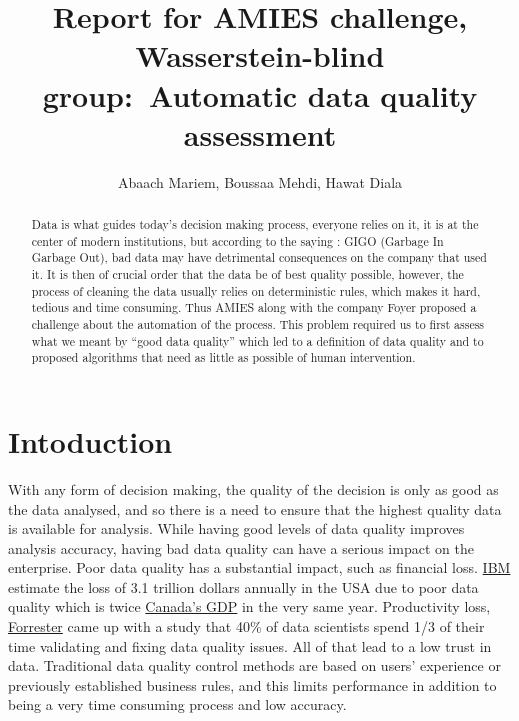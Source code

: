 \documentclass{article}
\title{\Large Report for AMIES challenge, Wasserstein-blind group:\ Automatic data quality assessment}
\author{Abaach Mariem, Boussaa Mehdi, Hawat Diala}
\date{}
\begin{document}
\maketitle

\begin{abstract}
    Data is what guides today's decision making process, everyone relies on it, it is at the center of modern institutions, but according to the saying : GIGO (Garbage In Garbage Out), bad data may have detrimental consequences on the company that used it.  It is then of crucial order that the data be of best quality possible, however, the process of cleaning the data usually relies on deterministic rules, which makes it hard, tedious and time consuming. Thus AMIES along with the company Foyer proposed a challenge about the automation of the process. This problem required us to first assess what we meant by ``good data quality'' which led to a definition of data quality and to proposed algorithms that need as little as possible of human intervention.
\end{abstract}
\tableofcontents
\section{Intoduction} %
\label{sec:Intoduction}
With any form of decision making, the quality of the decision is only as good as the data analysed, and so there is a need to ensure that the highest quality data is available for analysis. While having good levels of data quality improves analysis accuracy, having bad data quality can have a serious impact on the enterprise.
Poor data quality has a substantial impact, such as financial loss.  \href{https://www.ibm.com/blogs/journey-to-ai/}{IBM} estimate the loss of 3.1 trillion dollars annually  in the USA due to poor data quality which is twice \href{https://data.worldbank.org/indicator/NY.GDP.MKTP.CD}{Canada’s GDP} in the very same year. Productivity loss, \href{https://www.forrester.com/report/Build-Trusted-Data-With-Data-Quality/RES83344}{Forrester} came up with a study that 40\% of data scientists spend 1/3 of their time validating and fixing data quality issues. All of that lead to a low trust in data.
Traditional data quality control methods are based on users’ experience or previously established business rules, and this
limits performance in addition to being a very time consuming process and low accuracy.
\end{document}
